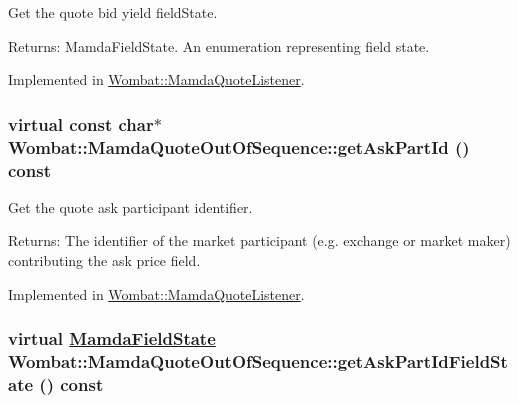 Get the quote bid yield field\-State. 

\begin{Desc}
\item[Returns:]Mamda\-Field\-State. An enumeration representing field state. \end{Desc}


Implemented in \hyperlink{classWombat_1_1MamdaQuoteListener_f43a394a5e090162a80b749f682ecc38}{Wombat::Mamda\-Quote\-Listener}.\hypertarget{classWombat_1_1MamdaQuoteOutOfSequence_12c5be28761ab6796c44466e06bbc37a}{
\subsubsection[getAskPartId]{\setlength{\rightskip}{0pt plus 5cm}virtual const char$\ast$ Wombat::Mamda\-Quote\-Out\-Of\-Sequence::get\-Ask\-Part\-Id () const}}
\label{classWombat_1_1MamdaQuoteOutOfSequence_12c5be28761ab6796c44466e06bbc37a}


Get the quote ask participant identifier. 

\begin{Desc}
\item[Returns:]The identifier of the market participant (e.g. exchange or market maker) contributing the ask price field. \end{Desc}


Implemented in \hyperlink{classWombat_1_1MamdaQuoteListener_b8a1c5463eb9ebf89fc402c32e2c81c7}{Wombat::Mamda\-Quote\-Listener}.\hypertarget{classWombat_1_1MamdaQuoteOutOfSequence_bf3a795aa218100f1d59fa05aec2748e}{
\subsubsection[getAskPartIdFieldState]{\setlength{\rightskip}{0pt plus 5cm}virtual \hyperlink{namespaceWombat_93aac974f2ab713554fd12a1fa3b7d2a}{Mamda\-Field\-State} Wombat::Mamda\-Quote\-Out\-Of\-Sequence::get\-Ask\-Part\-Id\-Field\-State () const}}
\label{classWombat_1_1MamdaQuoteOutOfSequence_bf3a795aa218100f1d59fa05aec2748e}


